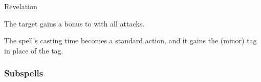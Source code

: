 \newpage
\begin{spellsection}{Revelation}

\begin{spellheader}
\end{spellheader}

\begin{spellcontent}

\begin{spelltargetinginfo}



\end{spelltargetinginfo}


\begin{spelleffects}



\spelleffect
The target gains a  bonus to  with all attacks.








\end{spelleffects}

\end{spellcontent}
\begin{spellfooter}


\end{spellfooter}
\begin{spellsubcontent}


\begin{spellcantrip}
The spell's casting time becomes a standard action, and it gains the  (minor) tag in place of the  tag.
\end{spellcantrip}


\end{spellsubcontent}
\end{spellsection}


\subsubsection{Subspells}





